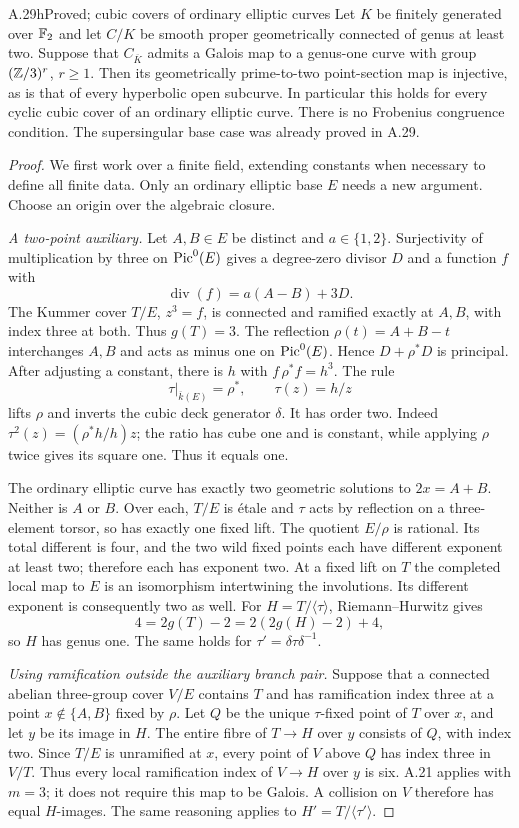 \begin{claim}{A.29h}{Proved; cubic covers of ordinary elliptic curves}
Let $K$ be finitely generated over $\mathbb F_2$ and let $C/K$
be smooth proper geometrically connected of genus at least
two. Suppose that $C_{\overline K}$ admits a Galois map
to a genus-one curve with group $(\mathbb Z/3)^r$, $r\ge1$.
Then its geometrically prime-to-two point-section map is
injective, as is that of every hyperbolic open subcurve.
In particular this holds for every cyclic cubic cover of
an ordinary elliptic curve. There is no Frobenius
congruence condition. The supersingular base case was
already proved in A.29.
\end{claim}
\begin{proof}
We first work over a finite field, extending constants
when necessary to define all finite data. Only an
ordinary elliptic base $E$ needs a new argument. Choose
an origin over the algebraic closure.

\emph{A two-point auxiliary.}
Let $A,B\in E$ be distinct and $a\in\{1,2\}$.
Surjectivity of multiplication by three on $\operatorname{Pic}^0(E)$
gives a degree-zero divisor $D$ and a function $f$ with
\[
 \operatorname{div}(f)=a(A-B)+3D.
\]
The Kummer cover $T/E$, $z^3=f$, is connected and ramified
exactly at $A,B$, with index three at both. Thus $g(T)=3$.
The reflection $\rho(t)=A+B-t$ interchanges $A,B$ and acts
as minus one on $\operatorname{Pic}^0(E)$. Hence $D+\rho^*D$ is principal.
After adjusting a constant, there is $h$ with
$f\,\rho^*f=h^3$. The rule
\[
 \tau|_{\overline k(E)}=\rho^*,\qquad \tau(z)=h/z
\]
lifts $\rho$ and inverts the cubic deck generator $\delta$.
It has order two. Indeed $\tau^2(z)=(\rho^*h/h)z$;
the ratio has cube one and is constant, while applying
$\rho$ twice gives its square one. Thus it equals one.

The ordinary elliptic curve has exactly two geometric
solutions to $2x=A+B$. Neither is $A$ or $B$.
Over each, $T/E$ is \'{e}tale and $\tau$ acts by reflection
on a three-element torsor, so has exactly one fixed lift.
The quotient $E/\rho$ is rational. Its total different
is four, and the two wild fixed points each have different
exponent at least two; therefore each has exponent two.
At a fixed lift on $T$ the completed local map to $E$ is
an isomorphism intertwining the involutions. Its different
exponent is consequently two as well. For
$H=T/\langle\tau\rangle$, Riemann--Hurwitz gives
\[
 4=2g(T)-2=2(2g(H)-2)+4,
\]
so $H$ has genus one. The same holds for
$\tau'=\delta\tau\delta^{-1}$.

\emph{Using ramification outside the auxiliary branch pair.}
Suppose that a connected abelian three-group cover $V/E$
contains $T$ and has ramification index three at a point
$x\notin\{A,B\}$ fixed by $\rho$. Let $Q$ be the unique
$\tau$-fixed point of $T$ over $x$, and let $y$ be its
image in $H$. The entire fibre of $T\to H$ over $y$
consists of $Q$, with index two. Since $T/E$ is unramified
at $x$, every point of $V$ above $Q$ has index three in
$V/T$. Thus every local ramification index of $V\to H$
over $y$ is six. A.21 applies with $m=3$; it does not
require this map to be Galois. A collision on $V$ therefore
has equal $H$-images. The same reasoning applies to
$H'=T/\langle\tau'\rangle$.


\end{proof}

